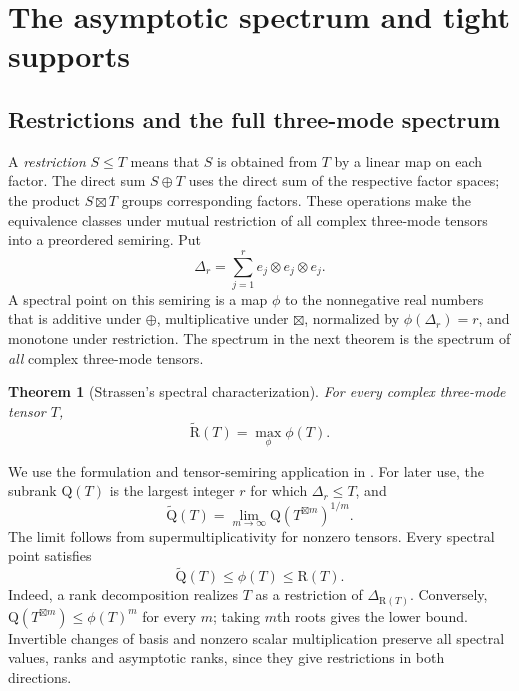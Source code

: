 \documentclass[10pt,a4paper]{article}
\newtheorem{theorem}{Theorem}[section]
\theoremstyle{definition}
\theoremstyle{remark}
\numberwithin{equation}{section}
\newcommand{\AR}{\widetilde{\mathrm R}}
\newcommand{\AQ}{\widetilde{\mathrm Q}}
\newcommand{\R}{\mathrm R}
\newcommand{\Q}{\mathrm Q}
\begin{document}
\section{The asymptotic spectrum and tight supports}\label{sec:classical}

\subsection{Restrictions and the full three-mode spectrum}

A \emph{restriction} $S\leq T$ means that $S$ is obtained from $T$
by a linear map on each factor. The direct sum $S\oplus T$ uses the
direct sum of the respective factor spaces; the product $S\boxtimes T$
groups corresponding factors. These operations make the equivalence
classes under mutual restriction of all complex three-mode tensors
into a preordered semiring. Put
\[
 \Delta_r=\sum_{j=1}^r e_j\otimes e_j\otimes e_j.
\]
A spectral point on this semiring is a map $\phi$ to the nonnegative
real numbers that is additive under $\oplus$, multiplicative under
$\boxtimes$, normalized by $\phi(\Delta_r)=r$, and monotone under
restriction. The spectrum in the next theorem is the spectrum of
\emph{all} complex three-mode tensors.

\begin{theorem}[Strassen's spectral characterization]\label{thm:spectrum}
For every complex three-mode tensor $T$,
\begin{equation}\label{eq:spectrum}
 \AR(T)=\max_{\phi}\phi(T).
\end{equation}
\end{theorem}

We use the formulation and tensor-semiring application in
\cite[Theorem~1.1 and Proposition~1.6]{CVZ2018}.
For later use, the subrank $\Q(T)$ is the largest integer $r$ for
which $\Delta_r\leq T$, and
\[
 \AQ(T)=\lim_{m\to\infty}\Q(T^{\boxtimes m})^{1/m}.
\]
The limit follows from supermultiplicativity for nonzero tensors.
Every spectral point satisfies
\begin{equation}\label{eq:spectral-bounds}
 \AQ(T)\leq\phi(T)\leq\R(T).
\end{equation}
Indeed, a rank decomposition realizes $T$ as a restriction of
$\Delta_{\R(T)}$. Conversely,
$\Q(T^{\boxtimes m})\leq\phi(T)^m$ for every $m$; taking $m$th
roots gives the lower bound. Invertible changes of basis and nonzero
scalar multiplication preserve all spectral values, ranks and
asymptotic ranks, since they give restrictions in both directions.
\end{document}
